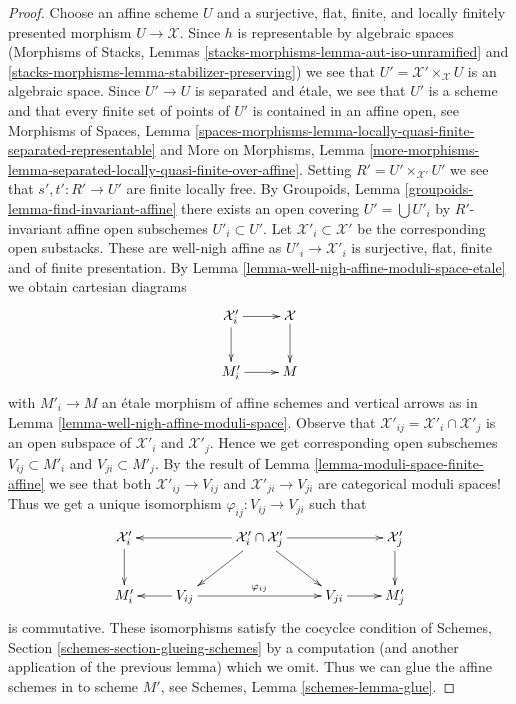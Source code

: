 \begin{proof}
Choose an affine scheme $U$ and a surjective, flat, finite, and
locally finitely presented morphism $U \to \mathcal{X}$.
Since $h$ is representable by algebraic spaces
(Morphisms of Stacks, Lemmas
\ref{stacks-morphisms-lemma-aut-iso-unramified} and
\ref{stacks-morphisms-lemma-stabilizer-preserving})
we see that $U' = \mathcal{X}' \times_\mathcal{X} U$ is
an algebraic space. Since $U' \to U$ is separated and \'etale,
we see that $U'$ is a scheme and that every finite set of points
of $U'$ is contained in an affine open, see
Morphisms of Spaces, Lemma
\ref{spaces-morphisms-lemma-locally-quasi-finite-separated-representable}
and
More on Morphisms, Lemma
\ref{more-morphisms-lemma-separated-locally-quasi-finite-over-affine}.
Setting $R' = U' \times_{\mathcal{X}'} U'$ we see
that $s', t' : R' \to U'$ are finite locally free.
By Groupoids, Lemma \ref{groupoids-lemma-find-invariant-affine}
there exists an open covering $U' = \bigcup U'_i$ by
$R'$-invariant affine open subschemes $U'_i \subset U'$.
Let $\mathcal{X}'_i \subset \mathcal{X}'$ be the corresponding
open substacks. These are well-nigh affine as $U'_i \to \mathcal{X}'_i$
is surjective, flat, finite and of finite presentation. By
Lemma \ref{lemma-well-nigh-affine-moduli-space-etale}
we obtain cartesian diagrams
$$
\xymatrix{
\mathcal{X}'_i \ar[r] \ar[d] & \mathcal{X} \ar[d] \\
M'_i \ar[r] & M
}
$$
with $M'_i \to M$ an \'etale morphism of affine schemes
and vertical arrows as in
Lemma \ref{lemma-well-nigh-affine-moduli-space}.
Observe that
$\mathcal{X}'_{ij} = \mathcal{X}'_i \cap \mathcal{X}'_j$
is an open subspace of $\mathcal{X}'_i$ and $\mathcal{X}'_j$.
Hence we get corresponding open subschemes
$V_{ij} \subset M'_i$ and $V_{ji} \subset M'_j$.
By the result of
Lemma \ref{lemma-moduli-space-finite-affine}
we see that both
$\mathcal{X}'_{ij} \to V_{ij}$ and
$\mathcal{X}'_{ji} \to V_{ji}$ are categorical moduli spaces!
Thus we get a unique isomorphism $\varphi_{ij} : V_{ij} \to V_{ji}$
such that
$$
\xymatrix{
\mathcal{X}'_i \ar[d] & &
\mathcal{X}'_i \cap \mathcal{X}'_j \ar[rr] \ar[ll] \ar[ld] \ar[rd] & &
\mathcal{X}'_j \ar[d] \\
M'_i &
V_{ij} \ar[l] \ar[rr]^{\varphi_{ij}} & &
V_{ji} \ar[r] &
M'_j
}
$$
is commutative. These isomorphisms satisfy the cocyclce condition of
Schemes, Section \ref{schemes-section-glueing-schemes} by a computation
(and another application of the previous lemma) which we omit.
Thus we can glue the affine schemes in to scheme $M'$, see
Schemes, Lemma \ref{schemes-lemma-glue}.

\end{proof}
